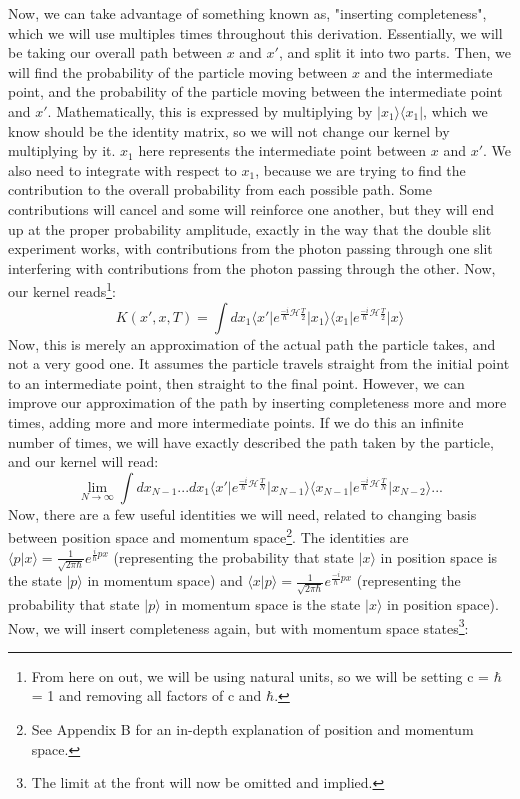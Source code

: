 \documentclass{report}
\begin{document}
Now, we can take advantage of something known as, "inserting completeness", which we will use multiples times throughout this derivation. Essentially, we will be taking our overall path between $x$ and $x'$, and split it into two parts. Then, we will find the probability of the particle moving between $x$ and the intermediate point, and the probability of the particle moving between the intermediate point and $x'$. Mathematically, this is expressed by multiplying by $\vert x_1 \rangle \langle x_1 \vert$, which we know should be the identity matrix, so we will not change our kernel by multiplying by it. $x_1$ here represents the intermediate point between $x$ and $x'$. We also need to integrate with respect to $x_1$, because we are trying to find the contribution to the overall probability from each possible path. Some contributions will cancel and some will reinforce one another, but they will end up at the proper probability amplitude, exactly in the way that the double slit experiment works, with contributions from the photon passing through one slit interfering with contributions from the photon passing through the other. Now, our kernel reads\footnote{From here on out, we will be using natural units, so we will be setting c = $\hbar$ = 1 and removing all factors of c and $\hbar$.}:
\[
K(x', x, T) = \int dx_1 \langle x' \vert e^{\frac{-i}{\hbar}\mathcal{H}\frac{T}{2}} \vert x_1 \rangle \langle x_1 \vert e^{\frac{-i}{\hbar}\mathcal{H}\frac{T}{2}} \vert x \rangle 
\]
Now, this is merely an approximation of the actual path the particle takes, and not a very good one. It assumes the particle travels straight from the initial point to an intermediate point, then straight to the final point. However, we can improve our approximation of the path by inserting completeness more and more times, adding more and more intermediate points. If we do this an infinite number of times, we will have exactly described the path taken by the particle, and our kernel will read:
\[
\lim_{N \to \infty} \int dx_{N-1}... dx_1 \langle x' \vert e^{\frac{-i}{\hbar}\mathcal{H}\frac{T}{N}} \vert x_{N-1} \rangle \langle x_{N-1} \vert e^{\frac{-i}{\hbar}\mathcal{H}\frac{T}{N}} \vert x_{N-2} \rangle ...
\]
Now, there are a few useful identities we will need, related to changing basis between position space and momentum space\footnote{See Appendix B for an in-depth explanation of position and momentum space.}. The identities are $\langle p \vert x \rangle = \frac{1}{\sqrt{2\pi\hbar}} e^{\frac{i}{\hbar}px}$ (representing the probability that state $\vert x \rangle$ in position space is the state $\vert p \rangle$ in momentum space) and $\langle x \vert p \rangle = \frac{1}{\sqrt{2\pi\hbar}} e^{\frac{-i}{\hbar}px}$ (representing the probability that state $\vert p \rangle$ in momentum space is the state $\vert x \rangle$ in position space). Now, we will insert completeness again, but with momentum space states\footnote{The limit at the front will now be omitted and implied.}:
\end{document}
